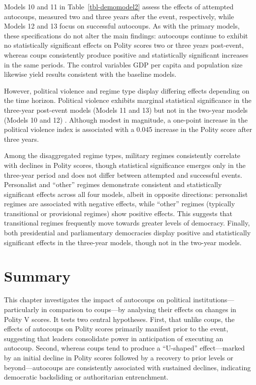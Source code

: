 \documentclass[
  12pt,
]{report}
\begin{document}
Models 10 and 11 in Table~\ref{tbl-demomodel2} assess the effects of
attempted autocoups, measured two and three years after the event,
respectively, while Models 12 and 13 focus on successful autocoups. As
with the primary models, these specifications do not alter the main
findings: autocoups continue to exhibit no statistically significant
effects on Polity scores two or three years post-event, whereas coups
consistently produce positive and statistically significant increases in
the same periods. The control variables GDP per capita and population
size likewise yield results consistent with the baseline models.

However, political violence and regime type display differing effects
depending on the time horizon. Political violence exhibits marginal
statistical significance in the three-year post-event models (Models 11
and 13) but not in the two-year models (Models 10 and 12) . Although
modest in magnitude, a one-point increase in the political violence
index is associated with a 0.045 increase in the Polity score after
three years.

Among the disaggregated regime types, military regimes consistently
correlate with declines in Polity scores, though statistical
significance emerges only in the three-year period and does not differ
between attempted and successful events. Personalist and ``other''
regimes demonstrate consistent and statistically significant effects
across all four models, albeit in opposite directions: personalist
regimes are associated with negative effects, while ``other'' regimes
(typically transitional or provisional regimes) show positive effects.
This suggests that transitional regimes frequently move towards greater
levels of democracy. Finally, both presidential and parliamentary
democracies display positive and statistically significant effects in
the three-year models, though not in the two-year models.

\section{Summary}\label{summary-3}

This chapter investigates the impact of autocoups on political
institutions---particularly in comparison to coups---by analysing their
effects on changes in Polity V scores. It tests two central hypotheses.
First, that unlike coups, the effects of autocoups on Polity scores
primarily manifest prior to the event, suggesting that leaders
consolidate power in anticipation of executing an autocoup. Second,
whereas coups tend to produce a ``U-shaped'' effect---marked by an
initial decline in Polity scores followed by a recovery to prior levels
or beyond---autocoups are consistently associated with sustained
declines, indicating democratic backsliding or authoritarian
entrenchment.
\end{document}
